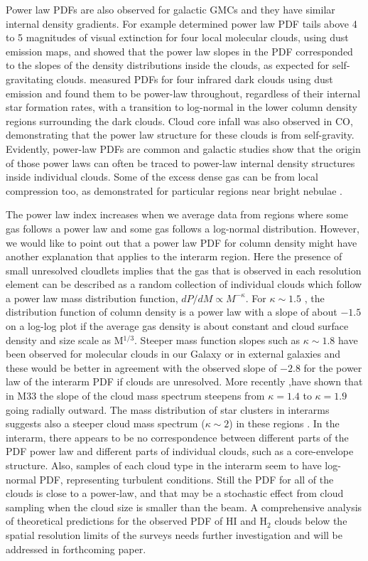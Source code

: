 \documentclass{aa}
\begin{document}
Power law PDFs are also observed for galactic GMCs and they have similar internal density gradients. 
For example \cite{schneider15c} determined power  law PDF tails above 4 to 5 magnitudes of visual extinction 
for four local molecular clouds, using dust emission maps, and showed that the power law slopes in the PDF corresponded 
to the slopes of the density distributions inside the clouds, as expected for self-gravitating clouds. 
\cite{schneider15a} measured PDFs for four infrared dark clouds using dust emission and found them to be power-law 
throughout, regardless of their internal star formation rates, with a transition to log-normal in the lower column density 
regions surrounding the dark clouds. Cloud core infall was also observed in CO, demonstrating that the power law 
structure for these clouds is from self-gravity. 
Evidently, power-law PDFs are common and galactic studies show that the origin of those power laws can often be traced 
to power-law internal density structures inside individual clouds. Some of the excess dense gas can be from local compression too, 
as demonstrated for particular regions near bright nebulae \citep{schneider12} .


The power law index increases when we average data from regions where some gas follows 
a power law and some gas follows a log-normal distribution.  However, we would like to 
point out that a power law PDF for column density might have  another explanation 
that applies to the interarm region. Here the presence of small unresolved 
cloudlets implies that the gas that is observed in each resolution element can be described as 
a random collection of individual clouds which follow a power law mass
distribution function, $dP/dM\propto M^{-\kappa}$. 
For $\kappa\sim1.5$ \citep[e.g.,][]{solomon87}, the distribution function
of column density is a power law with a slope of about $-1.5$ on a log-log
plot if the average gas density  is about constant and cloud surface density and
size scale as M$^{1/3}$.  Steeper mass function slopes   such as $\kappa\sim1.8$ have been
observed for molecular clouds in our Galaxy or in external galaxies \citep{heithausen98,2005PASP..117.1403R}
and these would be better in agreement with the observed slope of $-2.8$ for the power law of the interarm PDF
if clouds are unresolved. More recently \citet{2018A&A...612A..51B},have shown that in M33 the slope of 
the cloud mass spectrum steepens from $\kappa=1.4$ to $\kappa=1.9$ going radially outward. 
The mass distribution of star clusters in interarms  suggests also a steeper cloud mass spectrum ($\kappa\sim2$)
in these regions \citep{2018MNRAS.477.1683M}.   
In the interarm, there appears to be no correspondence
between different parts of the PDF power law and different parts of individual clouds,
such as a core-envelope structure. Also, samples of each
cloud type in the interarm seem to have   log-normal PDF, representing
turbulent conditions.  Still the PDF for all of the clouds is close to a
power-law, and that may be a stochastic effect from cloud sampling when the cloud
size is smaller than the beam.   A comprehensive
analysis of theoretical predictions for the observed PDF of HI and H$_2$ clouds 
below the spatial resolution limits of the surveys needs further investigation and  will be addressed 
in forthcoming paper. 
 
\end{document}
